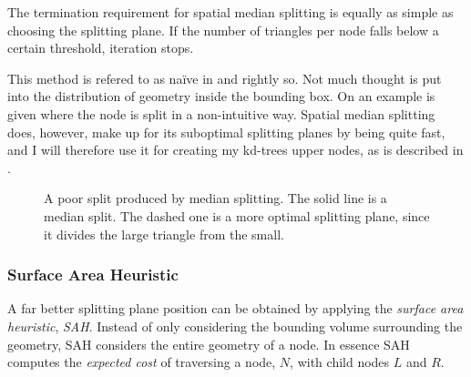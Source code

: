 The termination requirement for spatial median splitting is equally as
simple as choosing the splitting plane. If the number of triangles per
node falls below a certain threshold, iteration stops.


This method is refered to as naïve in  and
rightly so. Not much thought is put into the distribution of geometry
inside the bounding box. On  an example is
given where the node is split in a non-intuitive way. Spatial median
splitting does, however, make up for its suboptimal splitting planes
by being quite fast, and I will therefore use it for creating my
kd-trees upper nodes, as is described in .

\begin{figure}
  \centering

  \vspace{3mm}
  \parbox{5cm}{\caption[A poor split produced by median splitting.]{A
      poor split produced by median splitting. The solid line is a
      median split. The dashed one is a more optimal splitting plane,
      since it divides the large triangle from the
      small.}\label{fig:crapMedian}}
\end{figure}

\subsubsection{Surface Area Heuristic}


A far better splitting plane position can be obtained by applying the
\textit{surface area heuristic}, \textit{SAH}. Instead of only
considering the bounding volume surrounding the geometry, SAH
considers the entire geometry of a node. In essence SAH computes the
\textit{expected cost} of traversing a node, $N$, with child nodes $L$
and $R$.

